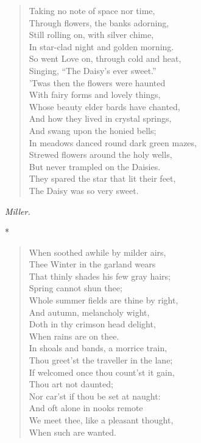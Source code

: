 \documentclass[11pt,twoside]{article}
\newcommand\stars{\begin{center}*\quad*\quad*\end{center}}
\newcommand\by[1]{\par\hfill\textit{#1}\par}
\begin{document}
\begin{verse}
Taking no note of space nor time,\\
\quad Through flowers, the banks adorning,\\
Still rolling on, with silver chime,\\
\quad In star-clad night and golden morning.\\
So went Love on, through cold and heat,\\
Singing, “The Daisy’s ever sweet.”\\
’Twas then the flowers were haunted\\
\quad With fairy forms and lovely things,\\
Whose beauty elder bards have chanted,\\
\quad And how they lived in crystal springs,\\
And swang upon the honied bells;\\
\quad In meadows danced round dark green mazes,\\
Strewed flowers around the holy wells,\\
\quad But never trampled on the Daisies.\\
They spared the star that lit their feet,\\
The Daisy was so very sweet.
\end{verse}

\by{Miller.}

\stars

\begin{verse}
When soothed awhile by milder airs,\\
Thee Winter in the garland wears\\
That thinly shades his few gray hairs;\\
\quad Spring cannot shun thee;\\
Whole summer fields are thine by right,\\
And autumn, melancholy wight,\\
Doth in thy crimson head delight,\\
\quad When rains are on thee.\\
In shoals and bands, a morrice train,\\
Thou greet’st the traveller in the lane;\\
If welcomed once thou count’st it gain,\\
\quad Thou art not daunted;\\
Nor car’st if thou be set at naught:\\
And oft alone in nooks remote\\
We meet thee, like a pleasant thought,\\
\quad When such are wanted.
\end{verse}
\end{document}
